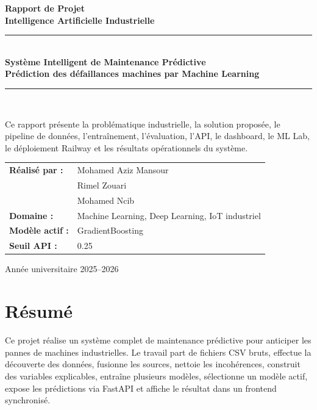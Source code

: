\documentclass[12pt,a4paper]{report}
\begin{document}
\begin{titlepage}
    \centering
    \vspace*{0.8cm}
    {\Large\textbf{Rapport de Projet}}\\[0.25cm]
    {\large\color{rougeprincipal}\textbf{Intelligence Artificielle Industrielle}}\\[1.1cm]
    \rule{0.82\textwidth}{0.8pt}\\[0.55cm]
    {\Huge\textbf{Système Intelligent de Maintenance Prédictive}}\\[0.45cm]
    {\Large\textbf{Prédiction des défaillances machines par Machine Learning}}\\[0.55cm]
    \rule{0.82\textwidth}{0.8pt}\\[1.2cm]
    \begin{minipage}{0.82\textwidth}
        \centering
        \large
        Ce rapport présente la problématique industrielle, la solution proposée, le pipeline de données, l'entraînement, l'évaluation, l'API, le dashboard, le ML Lab, le déploiement Railway et les résultats opérationnels du système.
    \end{minipage}
    \vfill
    \begin{minipage}{0.72\textwidth}
        \large
        \begin{tabular}{@{}p{}p{}@{}}
            \textbf{Réalisé par :} & Mohamed Aziz Mansour \\
                                   & Rimel Zouari \\
                                   & Mohamed Ncib \\[0.45cm]
            \textbf{Domaine :} & Machine Learning, Deep Learning, IoT industriel \\[0.2cm]
            \textbf{Modèle actif :} & GradientBoosting \\[0.2cm]
            \textbf{Seuil API :} & 0.25 \\
        \end{tabular}
    \end{minipage}
    \vfill
    {\large Année universitaire 2025--2026}\\[0.4cm]
\end{titlepage}

\chapter*{Résumé}
Ce projet réalise un système complet de maintenance prédictive pour anticiper les pannes de machines industrielles. Le travail part de fichiers CSV bruts, effectue la découverte des données, fusionne les sources, nettoie les incohérences, construit des variables explicables, entraîne plusieurs modèles, sélectionne un modèle actif, expose les prédictions via FastAPI et affiche le résultat dans un frontend synchronisé.
\end{document}
